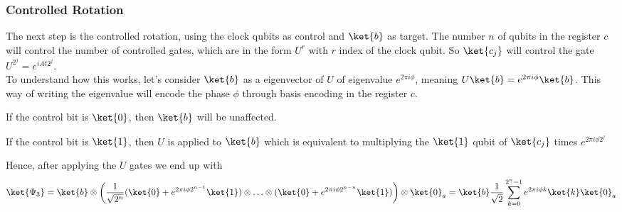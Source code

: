 \documentclass[10pt]{article}
\begin{document}
\subsubsection{Controlled Rotation}
The next step is the controlled rotation, using the clock qubits as control and $\ket{b}$ as target. The number $n$ of qubits in the register $c$ will control the number of controlled gates, which are in the form $U^r$ with $r$ index of the clock qubit. So $\ket{c_j}$ will control the gate $U^{2^j}=e^{iAt2^j}$.\\
To understand how this works, let's consider $\ket{b}$ as a eigenvector of $U$ of eigenvalue $e^{2\pi i\phi}$, meaning $U\ket{b}=e^{2\pi i\phi}\ket{b}$.
This way of writing the eigenvalue will encode the phase $\phi$ through basis encoding in the register $c$.
\begin{list}{}{}
	\item If the control bit is $\ket{0}$, then $\ket{b}$ will be unaffected.
	\item If the control bit is $\ket{1}$, then $U$ is applied to $\ket{b}$ which is equivalent to multiplying the $\ket{1}$ qubit of $\ket{c_j}$ times $e^{2\pi i\phi2^j}$
\end{list}
Hence, after applying the $U$ gates we end up with
$$\ket{\Psi_3} = \ket{b}\otimes\left(\frac{1}{\sqrt{2^n}}(\ket{0}+e^{2\pi i\phi 2^{n-1}}\ket{1})\otimes \ldots \otimes (\ket{0}+e^{2\pi i\phi 2^{n-n}}\ket{1})\right)\otimes \ket{0}_a =\ket{b}\frac{1}{\sqrt{2}}\sum_{k=0}^{2^n-1}e^{2\pi i\phi k}\ket{k}\ket{0}_a$$
\end{document}

